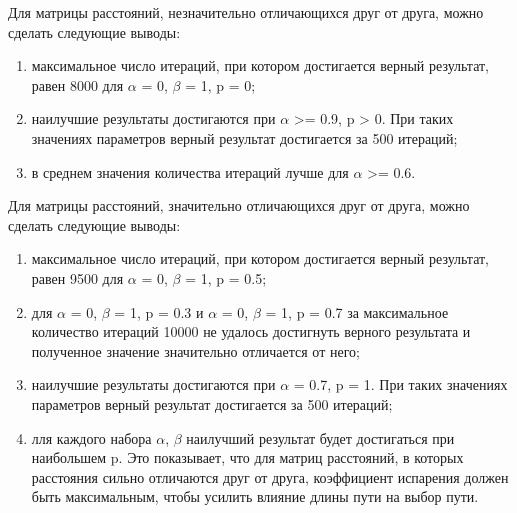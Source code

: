 Для матрицы расстояний, незначительно отличающихся друг от друга, можно сделать
следующие выводы:
\begin{enumerate}
	\item максимальное число итераций, при котором достигается верный результат, равен 8000 для $\alpha$ = 0, $\beta$ = 1, p = 0;
	\item наилучшие результаты достигаются при $\alpha$ >= 0.9, p > 0. При таких значениях параметров верный результат достигается за 500 итераций;
	\item в среднем значения количества итераций лучше для $\alpha$ >= 0.6.
\end{enumerate}

Для матрицы расстояний, значительно отличающихся друг от друга, можно сделать
следующие выводы:
\begin{enumerate}
	\item максимальное число итераций, при котором достигается верный результат, равен 9500 для $\alpha$ = 0, $\beta$ = 1, p = 0.5;
	\item для $\alpha$ = 0, $\beta$ = 1, p = 0.3 и $\alpha$ = 0, $\beta$ = 1, p = 0.7 за максимальное количество итераций 10000 не удалось достигнуть верного результата и полученное значение значительно отличается от него;
	\item наилучшие результаты достигаются при $\alpha$ = 0.7, p = 1. При таких значениях параметров верный результат достигается за 500 итераций;
	\item лля каждого набора $\alpha$, $\beta$ наилучший результат будет достигаться при наибольшем p. Это показывает, что для матриц расстояний, в которых расстояния сильно отличаются друг от друга, коэффициент испарения должен быть максимальным, чтобы усилить влияние длины пути на выбор пути.
\end{enumerate}